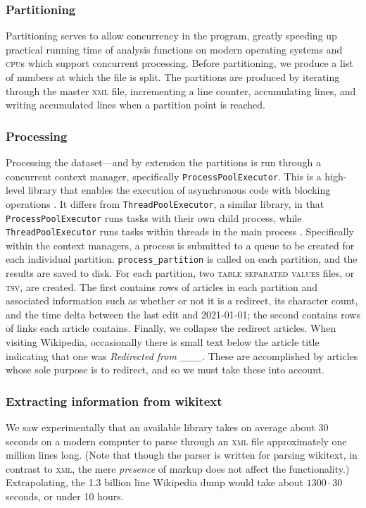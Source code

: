 \documentclass[fontsize=12pt]{article}
\newcommand{\py}[1]{\texttt{#1}}
\begin{document}
\begin{multicols}{2}
    \subsubsection{Partitioning}
    Partitioning serves to allow concurrency in the program, greatly speeding up practical running time of analysis functions on modern operating systems and \textsc{cpu}s which support concurrent processing. Before partitioning, we produce a list of numbers at which the file is split. The partitions are produced by iterating through the master \textsc{xml} file, incrementing a line counter, accumulating lines, and writing accumulated lines when a partition point is reached.

    \subsubsection{Processing}
    Processing the dataset---and by extension the partitions is run through a concurrent context manager, specifically \py{ProcessPoolExecutor}. This is a high-level library that enables the execution of asynchronous code with blocking operations \parencite{concurrent}. It differs from \py{ThreadPoolExecutor}, a similar library, in that \py{ProcessPoolExecutor} runs tasks with their own child process, while \py{ThreadPoolExecutor} runs tasks within threads in the main process \parencite{difference}. Specifically within the context managers, a process is submitted to a queue to be created for each individual partition. \py{process_partition} is called on each partition, and the results are saved to disk.
    For each partition, two \textsc{table separated values} files, or \textsc{tsv}, are created. The first contains rows of articles in each partition and associated information such as whether or not it is a redirect, its character count, and the time delta between the last edit and 2021-01-01; the second contains rows of links each article contains. 
    Finally, we collapse the redirect articles. When visiting Wikipedia, occasionally there is small text below the article title indicating that one was \emph{Redirected from \_\_\_}. These are accomplished by articles whose sole purpose is to redirect, and so we must take these into account. 

    \subsubsection{Extracting information from wikitext}
    We saw experimentally that an available library takes on average about 30 seconds on a modern computer to parse through an \textsc{xml} file approximately one million lines long. (Note that though the parser is written for parsing wikitext, in contrast to \textsc{xml}, the mere \emph{presence} of markup does not affect the functionality.) Extrapolating, the 1.3 billion line Wikipedia dump would take about \(1300 \cdot 30\) seconds, or under 10 hours.
    

\end{multicols}
\end{document}
